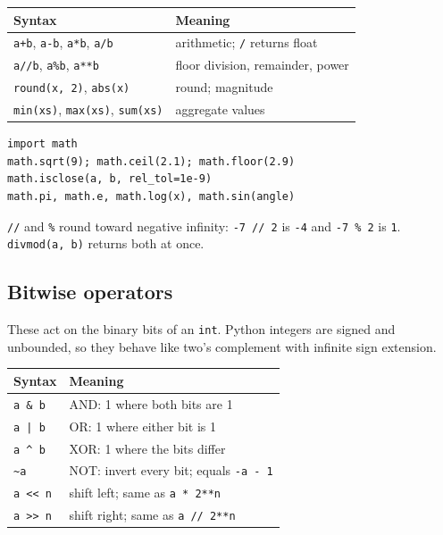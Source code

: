 \documentclass[10pt,a4paper]{article}
\newcommand{\py}[1]{\texttt{#1}}
\newenvironment{tbl}{\par\begin{lrbox}{\tblbox}\begin{minipage}{\linewidth}\compacttable}%
  {\end{minipage}\end{lrbox}\noindent\raisebox{\dp\tblbox}{\usebox{\tblbox}}\par}
\newcommand{\compacttable}{\fontsize{10}{11.2}\selectfont\setlength{\tabcolsep}{2.5pt}\renewcommand{\arraystretch}{1.08}}
\begin{document}
\begin{multicols}{2}
\begin{tbl}
\begin{tabularx}{\linewidth}{@{}R{.42\linewidth}L@{}}
\toprule
\textbf{Syntax} & \textbf{Meaning} \\
\midrule
\py{a+b}, \py{a-b}, \py{a*b}, \py{a/b} & arithmetic; \py{/} returns float \\
\py{a//b}, \py{a\%b}, \py{a**b} & floor division, remainder, power \\
\py{round(x, 2)}, \py{abs(x)} & round; magnitude \\
\py{min(xs)}, \py{max(xs)}, \py{sum(xs)} & aggregate values \\
\bottomrule
\end{tabularx}
\end{tbl}

\begin{lstlisting}
import math
math.sqrt(9); math.ceil(2.1); math.floor(2.9)
math.isclose(a, b, rel_tol=1e-9)
math.pi, math.e, math.log(x), math.sin(angle)
\end{lstlisting}

\py{//} and \py{\%} round toward negative infinity: \py{-7 // 2} is \py{-4} and \py{-7 \% 2} is \py{1}. \py{divmod(a, b)} returns both at once.

\subsection{Bitwise operators}

These act on the binary bits of an \py{int}. Python integers are signed and unbounded, so they behave like two's complement with infinite sign extension.

\begin{tbl}
\begin{tabularx}{\linewidth}{@{}R{.20\linewidth}L@{}}
\toprule
\textbf{Syntax} & \textbf{Meaning} \\
\midrule
\py{a \& b} & AND: 1 where both bits are 1 \\
\py{a | b} & OR: 1 where either bit is 1 \\
\py{a \textasciicircum{} b} & XOR: 1 where the bits differ \\
\py{\textasciitilde{}a} & NOT: invert every bit; equals \py{-a - 1} \\
\py{a <{}< n} & shift left; same as \py{a * 2**n} \\
\py{a >{}> n} & shift right; same as \py{a // 2**n} \\
\bottomrule
\end{tabularx}
\end{tbl}


\end{multicols}
\end{document}
